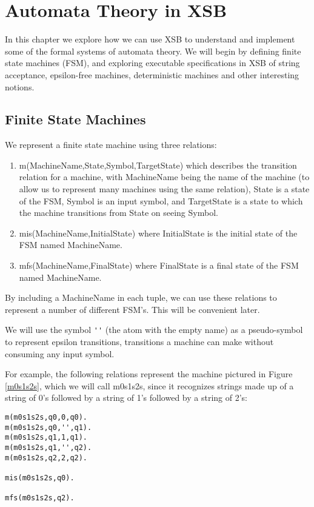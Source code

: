 \chapter{Automata Theory in XSB}

In this chapter we explore how we can use XSB to understand and
implement some of the formal systems of automata theory.  We will
begin by defining finite state machines (FSM), and exploring
executable specifications in XSB of string acceptance, epsilon-free
machines, deterministic machines and other interesting notions.

\section{Finite State Machines}

We represent a finite state machine using three relations:
\begin{enumerate}
\item
m(MachineName,State,Symbol,TargetState) which describes the transition
relation for a machine, with MachineName being the name of the machine
(to allow us to represent many machines using the same relation),
State is a state of the FSM, Symbol is an input symbol, and
TargetState is a state to which the machine transitions from State on
seeing Symbol.

\item
mis(MachineName,InitialState) where InitialState is the initial state
of the FSM named MachineName.

\item
mfs(MachineName,FinalState) where FinalState is a final state of the
FSM named MachineName.
\end{enumerate}

By including a MachineName in each tuple, we can use these relations to
represent a number of different FSM's.  This will be convenient later.

We will use the symbol \verb|''| (the atom with the empty name) as a
pseudo-symbol to represent epsilon transitions, transitions a machine
can make without consuming any input symbol.

For example, the following relations represent the machine pictured in
Figure \ref{m0s1s2s}, which we will call m0s1s2s, since it recognizes
strings made up of a string of 0's followed by a string of 1's
followed by a string of 2's:
\begin{verbatim}
m(m0s1s2s,q0,0,q0).
m(m0s1s2s,q0,'',q1).
m(m0s1s2s,q1,1,q1).
m(m0s1s2s,q1,'',q2).
m(m0s1s2s,q2,2,q2).

mis(m0s1s2s,q0).

mfs(m0s1s2s,q2).
\end{verbatim}

